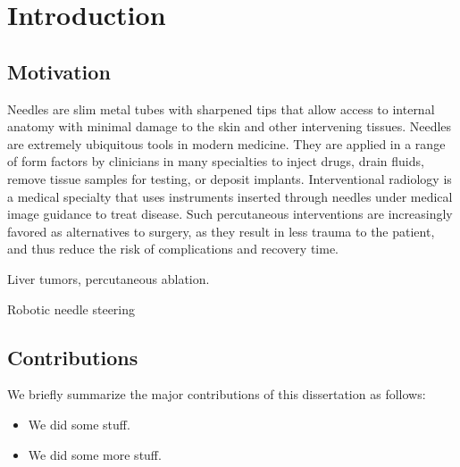 \chapter{Introduction}

\section{Motivation}
Needles are slim metal tubes with sharpened tips that allow access to internal anatomy with minimal damage to the skin and other intervening tissues. Needles are extremely ubiquitous tools in modern medicine. They are applied in a range of form factors by clinicians in many specialties to inject drugs, drain fluids, remove tissue samples for testing, or deposit implants. Interventional radiology is a medical specialty that uses instruments inserted through needles under medical image guidance to treat disease. Such percutaneous interventions are increasingly favored as alternatives to surgery, as they result in less trauma to the patient, and thus reduce the risk of complications and recovery time. 

Liver tumors, percutaneous ablation.

Robotic needle steering

\section{Contributions}
We briefly summarize the major contributions of this dissertation as follows:
\begin{itemize}
\item We did some stuff.
\item We did some more stuff.
\end{itemize}


